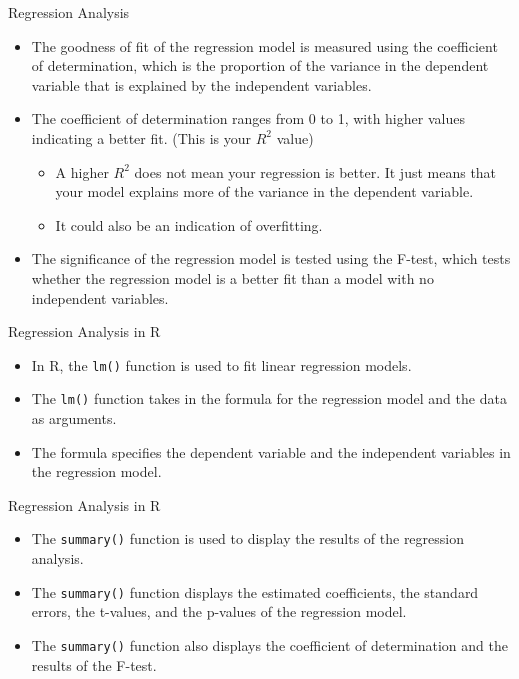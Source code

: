 \documentclass[serif, 9pt, aspectratio=32]{beamer}
\begin{document}
\begin{frame}{Regression Analysis}
    \begin{itemize}
        \setlength{\itemsep}{2em}
        \item The goodness of fit of the regression model is measured using the coefficient of determination, which is the proportion of the variance in the dependent variable that is explained by the independent variables.
        \item The coefficient of determination ranges from 0 to 1, with higher values indicating a better fit. (This is your $R^2$ value)
              \begin{itemize}
                  \item A higher $R^2$ does not mean your regression is better. It just means that your model explains more of the variance in the dependent variable.
                  \item It could also be an indication of overfitting.
              \end{itemize}
        \item The significance of the regression model is tested using the F-test, which tests whether the regression model is a better fit than a model with no independent variables.
    \end{itemize}
\end{frame}

\begin{frame}{Regression Analysis in R}
    \begin{itemize}
        \setlength{\itemsep}{2em}
        \item In R, the \texttt{lm()} function is used to fit linear regression models.
        \item The \texttt{lm()} function takes in the formula for the regression model and the data as arguments.
        \item The formula specifies the dependent variable and the independent variables in the regression model.
    \end{itemize}
\end{frame}

\begin{frame}{Regression Analysis in R}
    \begin{itemize}
        \setlength{\itemsep}{2em}
        \item The \texttt{summary()} function is used to display the results of the regression analysis.
        \item The \texttt{summary()} function displays the estimated coefficients, the standard errors, the t-values, and the p-values of the regression model.
        \item The \texttt{summary()} function also displays the coefficient of determination and the results of the F-test.
    \end{itemize}
\end{frame}
\end{document}
